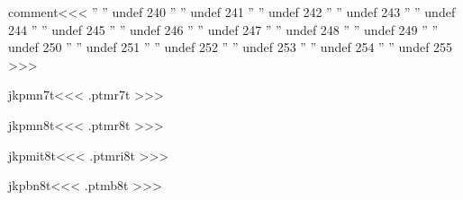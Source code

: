 \<comment\><<<
'' ''   undef    240
'' ''   undef    241
'' ''   undef    242
'' ''   undef    243
'' ''   undef    244
'' ''   undef    245
'' ''   undef    246
'' ''   undef    247
'' ''   undef    248
'' ''   undef    249
'' ''   undef    250
'' ''   undef    251
'' ''   undef    252
'' ''   undef    253
'' ''   undef    254
'' ''   undef    255           
>>>



\<jkpmn7t\><<<
.ptmr7t
>>>

\<jkpmn8t\><<<
.ptmr8t
>>>

\<jkpmit8t\><<<
.ptmri8t
>>>

\<jkpbn8t\><<<
.ptmb8t
>>>



\bye
